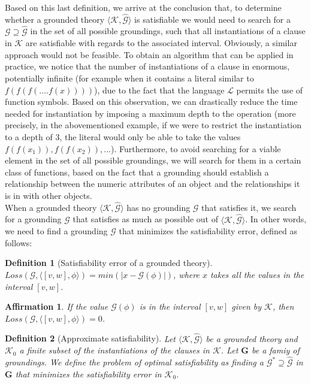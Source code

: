 \documentclass{article}
\newtheorem{definition}{Definition}[section]
\newtheorem{prop}{Affirmation}[section]
\begin{document}
Based on this last definition, we arrive at the conclusion that, to determine whether a grounded theory $\langle \mathcal{K},  \widehat{\mathcal{G}} \rangle$ is satisfiable we would need to search for a $\mathcal{G} \supseteq \widehat{\mathcal{G}}$ in the set of all possible groundings, such that all instantiations of a clause in $\mathcal{K}$ are satisfiable with regards to the associated interval. Obviously, a similar approach would not be feasible. To obtain an algorithm that can be applied in practice, we notice that the number of instantiations of a clause in enormous, potentially infinite (for example when it contains a literal similar to $f(f(f(....f(x))))$), due to the fact that the language $\mathcal{L}$ permits the use of function symbols. Based on this observation, we can drastically reduce the time needed for instantiation by imposing a maximum depth to the operation (more precisely, in the abovementioned example, if we were to restrict the instantiation to a depth of 3, the literal would only be able to take the values $f(f(x_1)), f(f(x_2)), ...$). Furthermore, to avoid searching for a viable element in the set of all possible groundings, we will search for them in a certain class of functions, based on the fact that a grounding should establish a relationship between the numeric attributes of an object and the relationships it is in with other objects. \cite{LTN}\\ 
When a grounded theory $\langle \mathcal{K},  \widehat{\mathcal{G}} \rangle$ has no grounding $\mathcal{G}$ that satisfies it, we search for a grounding $\mathcal{G}$ that satisfies as much as possible out of $\langle \mathcal{K},  \widehat{\mathcal{G}} \rangle$. In other words, we need to find a grounding $\mathcal{G}$ that minimizes the satisfiability error, defined as follows:

\begin{definition}[Satisfiability error  of a grounded theory]
$Loss(\mathcal{G}, \langle [v, w], \phi \rangle) = min(|x - \mathcal{G}(\phi)|)$, where $x$ takes all the values in the interval $[v, w]$. \cite{LTN}
\end{definition}

\begin{prop}
If the value $\mathcal{G}(\phi)$ is in the interval $[v, w]$ given by $\mathcal{K}$, then $Loss(\mathcal{G}, \langle [v, w], \phi \rangle) = 0$. \cite{LTN}
\end{prop}

\begin{definition}[Approximate satisfiability]
Let $\langle \mathcal{K},  \widehat{\mathcal{G}} \rangle$ be a grounded theory and $\mathcal{K}_0$ a finite subset of the instantiations of the clauses in $\mathcal{K}$. Let $\mathbf{G}$ be a famiy of groundings. We define the problem of optimal satisfiability as finding a $\mathcal{G}^* \supseteq \widehat{\mathcal{G}}$ in $\mathbf{G}$ that minimizes the satisfiability error in $\mathcal{K}_0$. \cite{LTN}
\end{definition}
\end{document}
